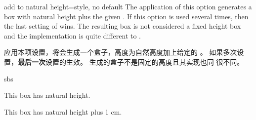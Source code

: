 
\begin{docTcbKey}[][doc new=2016-02-16]{add to natural height}{=}{style, no default}
The application of this option generates a box with natural height plus
the given . If this option is used several times, then the
last setting of  wins. The resulting box is not considered
a fixed height box and the implementation is quite different to
.

应用本项设置，将会生成一个盒子，高度为自然高度加上给定的 。
如果多次设置，{\bf 最后一次}设置的生效。 生成的盒子不是固定的高度且其实现也同  很不同。
\begin{dispExample*}{sbs}

\begin{tcolorbox}
This box has natural height.
\end{tcolorbox}
\begin{tcolorbox}[add to natural height=1cm]
This box has natural height plus 1 cm.
\end{tcolorbox}
\end{dispExample*}
\end{docTcbKey}
